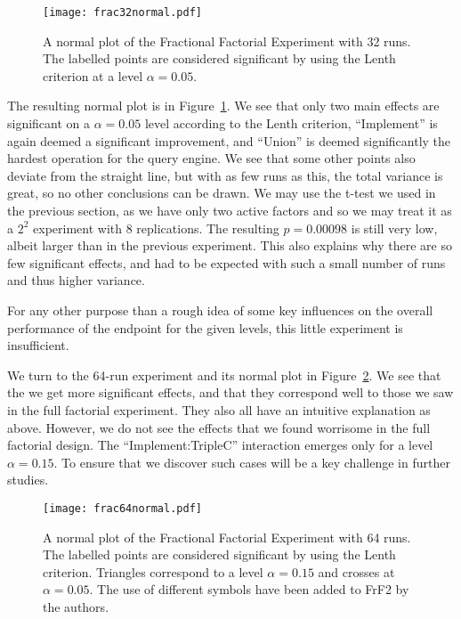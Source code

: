 \documentclass{llncs}
\begin{document}
\begin{figure}[ht!]
  \centerline{%
    \texttt{[image: frac32normal.pdf]}}
  \caption{A normal plot of the Fractional Factorial Experiment with
    32 runs. The labelled points are considered significant by using
    the Lenth criterion at a level
    $\alpha=0.05$.}
  \label{fig:frac32normal}
\end{figure}


The resulting normal plot is in Figure~\ref{fig:frac32normal}. We see
that only two main effects are significant on a $\alpha = 0.05$ level
according to the Lenth criterion, ``Implement'' is again deemed a
significant improvement, and ``Union'' is deemed significantly the
hardest operation for the query engine. We see that some other points
also deviate from the straight line, but with as few runs as this, the
total variance is great, so no other conclusions can be drawn. We may
use the t-test we used in the previous section, as we have only two
active factors and so we may treat it as a $2^2$ experiment with 8
replications. The resulting $p = 0.00098$ is still very low, albeit
larger than in the previous experiment. This also explains why there
are so few significant effects, and had to be expected with such a
small number of runs and thus higher variance.


For any other purpose than a rough idea of some key influences on the
overall performance of the endpoint for the given levels, this little
experiment is insufficient.

We turn to the 64-run experiment and its normal plot in
Figure~\ref{fig:frac64normal}. We see that the we get more significant
effects, and that they correspond well to those we saw in the full
factorial experiment. They also all have an intuitive explanation as
above. However, we do not see the effects that we found worrisome in
the full factorial design. The ``Implement:TripleC'' interaction
emerges only for a level $\alpha=0.15$. To ensure that we discover
such cases will be a key challenge in further studies.

\begin{figure}[ht!]
  \centerline{%
    \texttt{[image: frac64normal.pdf]}}
  \caption{A normal plot of the Fractional Factorial Experiment with
    64 runs. The labelled points are considered significant by using
    the Lenth criterion. Triangles correspond to a level $\alpha=0.15$
    and crosses at $\alpha=0.05$. The use of different symbols have
    been added to FrF2 by the authors.}\label{fig:frac64normal}
\end{figure}
\end{document}
